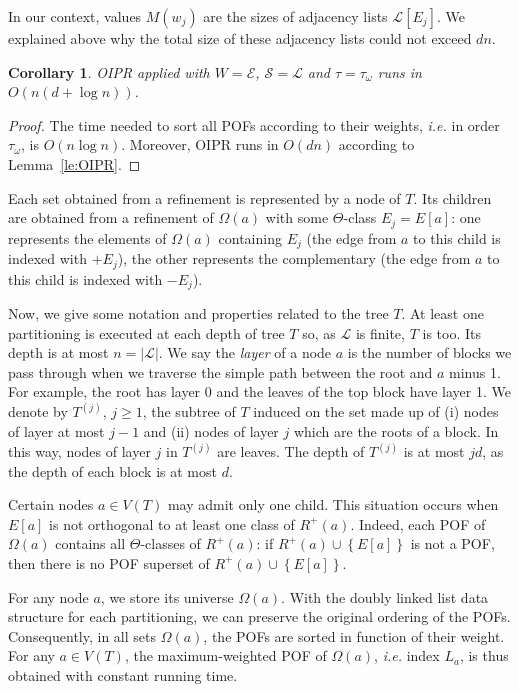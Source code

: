 \documentclass{article}
\newtheorem{corollary}{Corollary}
\newcommand{\set}[1]{\left\{ #1 \right\}}
\newcommand{\card}[1]{\left| #1 \right|}
\begin{document}
In our context, values $M(w_j)$ are the sizes of adjacency lists $\mathcal{L}\left[E_j\right]$. We explained above why the total size of these adjacency lists could not exceed $dn$.

\begin{corollary} OIPR applied with $W = \mathcal{E}$, $\mathcal{S} = \mathcal{L}$ and $\tau = \tau_{\omega}$ runs in $O(n(d+\log n))$.
\label{co:oipr}
\end{corollary}
\begin{proof}
The time needed to sort all POFs according to their weights, {\em i.e.} in order $\tau_{\omega}$, is $O(n\log n)$. Moreover, OIPR runs in $O(dn)$  according to Lemma~\ref{le:OIPR}.
\end{proof}

Each set obtained from a refinement is represented by a node of $T$. Its children are obtained from a refinement of $\Omega(a)$ with some $\Theta$-class $E_j=E\left[a\right]$: one represents the elements of $\Omega(a)$ containing $E_j$ (the edge from $a$ to this child is indexed with $+E_j$), the other represents the complementary (the edge from $a$ to this child is indexed with $-E_j$).

Now, we give some notation and properties related to the tree $T$. At least one partitioning is executed at each depth of tree $T$ so, as $\mathcal{L}$ is finite, $T$ is too. Its depth is at most $n = \card{\mathcal{L}}$. 
We say the \textit{layer} of a node $a$ is the number of blocks we pass through when we traverse the simple path between the root and $a$ minus 1. For example, the root has layer 0 and the leaves of the top block have layer 1. We denote by $T^{(j)}$, $j\ge 1$, the subtree of $T$ induced on the set made up of (i) nodes of layer at most $j-1$ and (ii) nodes of layer $j$ which are the roots of a block. In this way, nodes of layer $j$ in $T^{(j)}$ are leaves. The depth of $T^{(j)}$ is at most $jd$, as the depth of each block is at most $d$. 

Certain nodes $a \in V(T)$ may admit only one child. This situation occurs when $E\left[a\right]$ is not orthogonal to at least one class of $R^+(a)$. Indeed, each POF of $\Omega(a)$ contains all $\Theta$-classes of $R^+(a)$: if $R^+(a) \cup \set{E\left[a\right]}$ is not a POF, then there is no POF superset of $R^+(a) \cup \set{E\left[a\right]}$. 

For any node $a$, we store its universe $\Omega(a)$. With the doubly linked list data structure for each partitioning, we can preserve the original ordering of the POFs. Consequently, in all sets $\Omega(a)$, the POFs are sorted in function of their weight. For any $a \in V(T)$, the maximum-weighted POF of $\Omega(a)$, {\em i.e.} index $L_a$, is thus obtained with constant running time.
\end{document}
